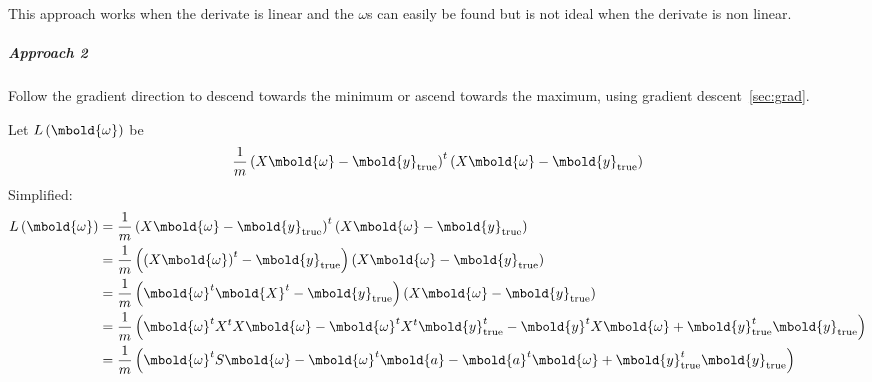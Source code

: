 \documentclass[12pt letter]{report}
\begin{document}
This approach works when the derivate is linear and the $\omega$s can easily be found but is not ideal when the derivate
is non linear.

\subparagraph{Approach 2}

Follow the gradient direction to descend towards the minimum or ascend towards the maximum, using gradient
descent~\ref{sec:grad}.


Let $L \left( \mbold{\omega} \right) $ be
\[
  \frac{1}{m} \left( X \mbold{\omega} - \mbold{y}_{\text{true}} \right)^{t} \left( X \mbold{\omega} -
  \mbold{y}_{\text{true}} \right)
\]
Simplified:
\begin{align*}
  L \left( \mbold{\omega} \right) & =   \frac{1}{m} \left( X \mbold{\omega} - \mbold{y}_{\text{true}} \right)^{t} \left( X \mbold{\omega} -
  \mbold{y}_{\text{true}} \right)                                                                                                                          \\
                                  & = \frac{1}{m} \left( \left( X \mbold{\omega} \right)^{t}  - \mbold{y}_{\text{true}} \right)  \left( X \mbold{\omega} -
  \mbold{y}_{\text{true}} \right)                                                                                                                          \\
                                  & = \frac{1}{m} \left( \mbold{\omega}^{t} \mbold{X}^{t}   -
  \mbold{y}_{\text{true}} \right) \left( X\mbold{\omega} - \mbold{y}_{\text{true}} \right)                                                                 \\
                                  & = \frac{1}{m} \left( \mbold{\omega}^{t} X^t X \mbold{\omega} - \mbold{\omega}^t X^t
  \mbold{y}^t_{\text{true}} - \mbold{y}^t X \mbold{\omega} + \mbold{y}^t_{\text{true}}
  \mbold{y}_{\text{true}} \right)                                                                                                                          \\
                                  & = \frac{1}{m} \left( \mbold{\omega}^t S \mbold{\omega}- \mbold{\omega}^t \mbold{a} -
  \mbold{a}^t \mbold{\omega}
  + \mbold{y}^t_{\text{true}} \mbold{y}_{\text{true}} \right)                                                                                              \\
\end{align*}
\end{document}
